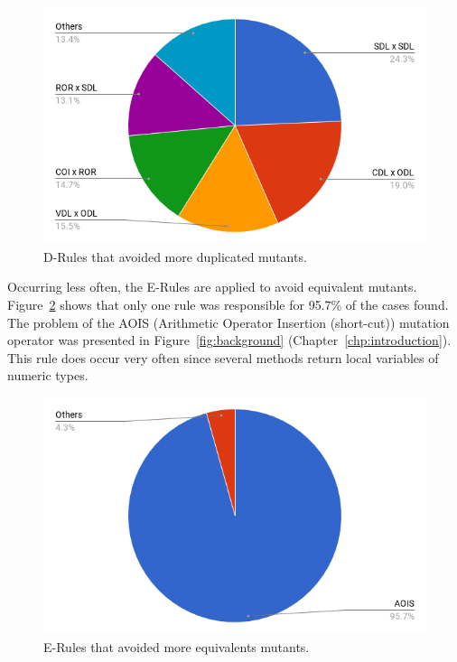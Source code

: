 \begin{figure}[htb]
	\begin{center}
		\includegraphics[scale=0.5]{images/chart-total-rules-duplicated.png}
		\caption{D-Rules that avoided more duplicated mutants.}
		\label{fig:rules-duplicated}
	\end{center}
\end{figure}

Occurring less often, the E-Rules are applied to avoid equivalent mutants.
Figure~\ref{fig:rules-equivalents} shows that only one rule was responsible for 95.7\% of the cases found.
The problem of the AOIS (Arithmetic Operator Insertion (short-cut)) mutation operator was presented in Figure~\ref{fig:background} (Chapter~\ref{chp:introduction}).
This rule does occur very often since several methods return local variables of numeric types.

\begin{figure}[htb]
	\begin{center}
		\includegraphics[scale=0.5]{images/chart-total-rules-equivalent.png}
		\caption{E-Rules that avoided more equivalents mutants.}
		\label{fig:rules-equivalents}
	\end{center}
\end{figure}

